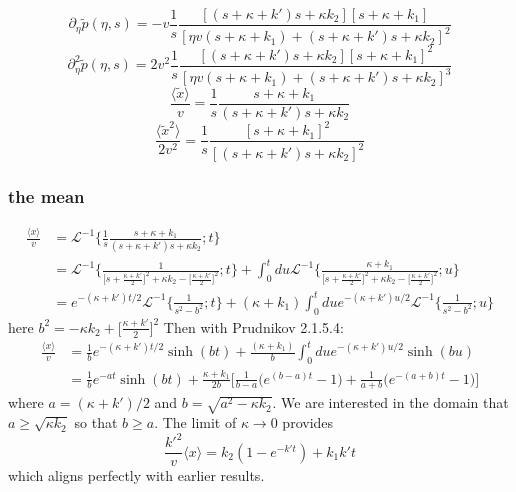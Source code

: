 \documentclass[]{agujournal2018}
\newcommand\be{\begin{equation}}
\newcommand\ee{\end{equation}}
\newcommand\bra{\langle}
\newcommand\ket{\rangle}
\newcommand\tp{\tilde{p}}
\newcommand\El{\mathcal{L}}
\begin{document}
\be \partial_\eta \tp(\eta,s) = -v \frac{1}{s}\frac{[(s+\kappa + k')s + \kappa k_2][s+\kappa + k_1]}{[\eta v(s+\kappa +k_1) + (s+ \kappa + k')s+\kappa k_2]^2}\ee
\be \partial_\eta^2 \tp(\eta,s) = 2v^2 \frac{1}{s} \frac{[(s+\kappa + k')s+\kappa k_2][s+\kappa + k_1]^2}{[\eta v(s+\kappa + k_1) + (s+\kappa + k')s+ \kappa k_2]^3}\ee
\be  \frac{\bra\tilde{x}\ket} {v} = \frac{1}{s}\frac{s+\kappa + k_1}{(s+\kappa + k')s + \kappa k_2}\ee
\be \frac{\bra \tilde{x}^2 \ket}{2v^2} = \frac{1}{s} \frac{[s+\kappa + k_1]^2}{[(s+\kappa + k')s + \kappa k_2]^2} \ee
\subsubsection{the mean}
\begin{align}
\frac{\bra x \ket}{v} &= \El^{-1}\Big\{\frac{1}{s}\frac{s+\kappa + k_1}{(s+\kappa + k')s + \kappa k_2};t\Big\} \\
&= \El^{-1}\Big\{\frac{1}{\big[s+\frac{\kappa+k'}{2}\big]^2+\kappa k_2 - \big[\frac{\kappa+k'}{2}\big]^2};t\Big\} + 
\int_0^t du \El^{-1}\Big\{\frac{\kappa + k_1}{\big[s+\frac{\kappa+k'}{2}\big]^2+\kappa k_2 - \big[\frac{\kappa+k'}{2}\big]^2};u\Big\}\\
&= e^{-(\kappa + k')t/2}\El^{-1}\Big\{\frac{1}{s^2 - b^2};t\Big\} + (\kappa + k_1)\int_0^t du e^{-(\kappa + k')u/2}\El^{-1}\Big\{\frac{1}{s^2 - b^2};u\Big\}
\end{align}
here $b^2 = -\kappa k_2 + \big[\frac{\kappa+k'}{2}\big]^2$
Then with Prudnikov 2.1.5.4:
\begin{align}
\frac{\bra x \ket}{v} &= \frac{1}{b}e^{-(\kappa + k')t/2}\sinh(bt) + \frac{(\kappa +k_1)}{b}\int_0^t due^{-(\kappa + k')u/2}\sinh(bu)\\
&=  \frac{1}{b}e^{-at}\sinh(bt) + \frac{\kappa + k_1}{2b}\Big[\frac{1}{b-a}\Big(e^{(b-a)t}-1\Big)+ \frac{1}{a+b}\Big(e^{-(a+b)t}-1\Big)\Big]
\end{align}
where $a=(\kappa + k')/2$ and $b = \sqrt{a^2 -\kappa k_2}$. We are interested in the domain that $a\geq \sqrt{\kappa k_2}$ so that $b\geq a$.
The limit of $\kappa \rightarrow 0$ provides
\be \frac{k'^2}{v}\bra x \ket=k_2(1-e^{-k't})+ k_1k't \ee
which aligns perfectly with earlier results.
\end{document}
